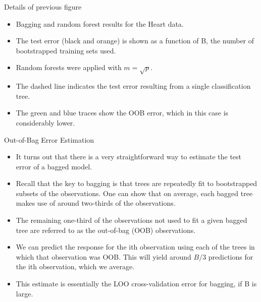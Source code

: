 \documentclass[aspectratio=169, 11pt]{beamer}
\begin{document}
\begin{frame}{Details of previous figure}
\begin{itemize}
    \item Bagging and random forest results for the Heart data.
    \item The test error (black and orange) is shown as a function of B, the number of bootstrapped training sets used.
    \item Random forests were applied with $m=\sqrt{p}$.
    \item The dashed line indicates the test error resulting from a single classification tree.
    \item The green and blue traces show the OOB error, which in this case is considerably lower.
\end{itemize}
\end{frame}

\begin{frame}{Out-of-Bag Error Estimation}
\begin{itemize}
    \item It turns out that there is a very straightforward way to estimate the test error of a bagged model.
    \item Recall that the key to bagging is that trees are repeatedly fit to bootstrapped subsets of the observations. One can show that on average, each bagged tree makes use of around two-thirds of the observations.
    \item The remaining one-third of the observations not used to fit a given bagged tree are referred to as the out-of-bag (OOB) observations.
    \item We can predict the response for the ith observation using each of the trees in which that observation was OOB. This will yield around $B/3$ predictions for the ith observation, which we average.
    \item This estimate is essentially the LOO cross-validation error for bagging, if B is large.
\end{itemize}
\end{frame}
\end{document}
